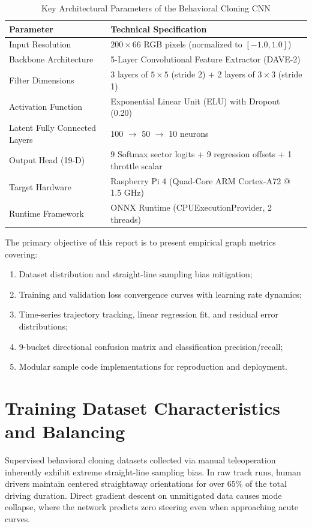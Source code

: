 \documentclass[a4paper,11pt]{article}
\begin{document}
\begin{table}[H]
\centering
\caption{Key Architectural Parameters of the Behavioral Cloning CNN}
\label{tab:arch_specs}
\begin{tabularx}{0.95\textwidth}{|l|X|}
\hline
\textbf{Parameter} & \textbf{Technical Specification} \\
\hline
Input Resolution & $200 \times 66$ RGB pixels (normalized to $[-1.0, 1.0]$) \\
Backbone Architecture & 5-Layer Convolutional Feature Extractor (DAVE-2) \\
Filter Dimensions & 3 layers of $5\times5$ (stride 2) + 2 layers of $3\times3$ (stride 1) \\
Activation Function & Exponential Linear Unit (ELU) with Dropout (0.20) \\
Latent Fully Connected Layers & 100 $\to$ 50 $\to$ 10 neurons \\
Output Head (19-D) & 9 Softmax sector logits + 9 regression offsets + 1 throttle scalar \\
Target Hardware & Raspberry Pi 4 (Quad-Core ARM Cortex-A72 @ 1.5 GHz) \\
Runtime Framework & ONNX Runtime (CPUExecutionProvider, 2 threads) \\
\hline
\end{tabularx}
\end{table}

The primary objective of this report is to present empirical graph metrics covering:
\begin{enumerate}
    \item Dataset distribution and straight-line sampling bias mitigation;
    \item Training and validation loss convergence curves with learning rate dynamics;
    \item Time-series trajectory tracking, linear regression fit, and residual error distributions;
    \item 9-bucket directional confusion matrix and classification precision/recall;
    \item Modular sample code implementations for reproduction and deployment.
\end{enumerate}

\section{Training Dataset Characteristics and Balancing}
Supervised behavioral cloning datasets collected via manual teleoperation inherently exhibit extreme straight-line sampling bias. In raw track runs, human drivers maintain centered straightaway orientations for over $65\%$ of the total driving duration. Direct gradient descent on unmitigated data causes mode collapse, where the network predicts zero steering even when approaching acute curves.
\end{document}
